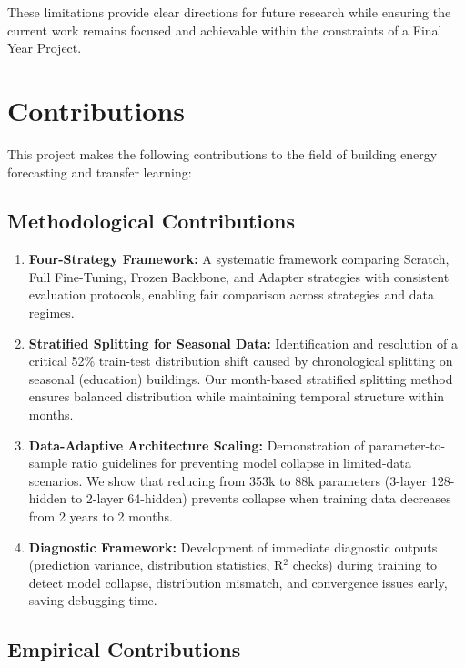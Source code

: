 \documentclass[12pt,a4paper]{report}
\begin{document}
These limitations provide clear directions for future research while ensuring the current work remains focused and achievable within the constraints of a Final Year Project.

\section{Contributions}

This project makes the following contributions to the field of building energy forecasting and transfer learning:

\subsection{Methodological Contributions}

\begin{enumerate}
    \item \textbf{Four-Strategy Framework:} A systematic framework comparing Scratch, Full Fine-Tuning, Frozen Backbone, and Adapter strategies with consistent evaluation protocols, enabling fair comparison across strategies and data regimes.
    
    \item \textbf{Stratified Splitting for Seasonal Data:} Identification and resolution of a critical 52\% train-test distribution shift caused by chronological splitting on seasonal (education) buildings. Our month-based stratified splitting method ensures balanced distribution while maintaining temporal structure within months.
    
    \item \textbf{Data-Adaptive Architecture Scaling:} Demonstration of parameter-to-sample ratio guidelines for preventing model collapse in limited-data scenarios. We show that reducing from 353k to 88k parameters (3-layer 128-hidden to 2-layer 64-hidden) prevents collapse when training data decreases from 2 years to 2 months.
    
    \item \textbf{Diagnostic Framework:} Development of immediate diagnostic outputs (prediction variance, distribution statistics, R$^2$ checks) during training to detect model collapse, distribution mismatch, and convergence issues early, saving debugging time.
\end{enumerate}

\subsection{Empirical Contributions}
\end{document}
